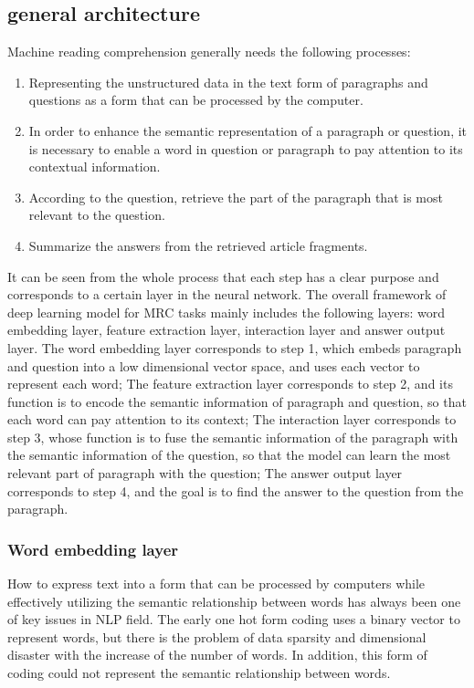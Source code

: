 \subsection{general architecture}
Machine reading comprehension generally needs the following processes:

\begin{enumerate}
	\item Representing the unstructured data in the text form of paragraphs and questions as a form that can be processed by the computer.
	\item In order to enhance the semantic representation of a paragraph or question, it is necessary to enable a word in question or paragraph to pay attention to its contextual information.
	\item According to the question, retrieve the part of the paragraph that is most relevant to the question.
	\item Summarize the answers from the retrieved article fragments.
\end{enumerate}

It can be seen from the whole process that each step has a clear purpose and corresponds to a certain layer in the neural network. The overall framework of 
deep learning model for MRC tasks mainly includes the following layers: word embedding layer, feature extraction layer, interaction layer and answer output layer. 
The word embedding layer corresponds to step 1, which embeds paragraph and question into a low dimensional vector space, and uses each vector to represent each word; 
The feature extraction layer corresponds to step 2, and its function is to encode the semantic information of paragraph and question, so that each word can pay attention to its context;
The interaction layer corresponds to step 3, whose function is to fuse the semantic information of the paragraph with the semantic information of the question, so that 
the model can learn the most relevant part of paragraph with the question; 
The answer output layer corresponds to step 4, and the goal is to find the answer to the question from the paragraph.

\subsubsection{Word embedding layer}
How to express text into a form that can be processed by computers while effectively utilizing the semantic relationship between words 
has always been one of key issues in NLP field. The early one hot form coding uses a binary vector to represent words, but there is the problem of 
data sparsity and dimensional disaster with the increase of the number of words. In addition, this form of coding could not represent the semantic 
relationship between words. 

